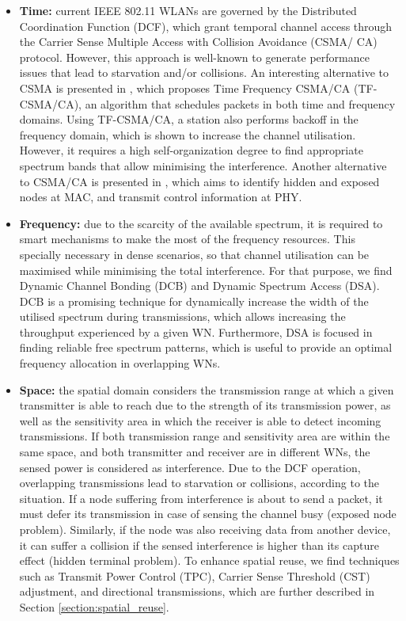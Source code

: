 \documentclass[12pt, a4paper,twoside]{tesi_upf}
\begin{document}
			\begin{itemize}
				\item \textbf{Time:} current IEEE 802.11 WLANs are governed by the Distributed Coordination Function (DCF), which grant temporal channel access through the Carrier Sense Multiple Access with Collision Avoidance (CSMA/ CA) protocol. However, this approach is well-known to generate performance issues that lead to starvation and/or collisions. An interesting alternative to CSMA is presented in \cite{herzen2015csma}, which proposes Time Frequency CSMA/CA (TF-CSMA/CA), an algorithm that schedules packets in both time and frequency domains. Using TF-CSMA/CA, a station also performs backoff in the frequency domain, which is shown to increase the channel utilisation. However, it requires a high self-organization degree to find appropriate spectrum bands that allow minimising the interference. Another alternative to CSMA/CA is presented in \cite{wang2012combating}, which aims to identify hidden and exposed nodes at MAC, and transmit control information at PHY.
				\item \textbf{Frequency:} due to the scarcity of the available spectrum, it is required to smart mechanisms to make the most of the frequency resources. This specially necessary in dense scenarios, so that channel utilisation can be maximised while minimising the total interference. For that purpose, we find Dynamic Channel Bonding (DCB) and Dynamic Spectrum Access (DSA). DCB is a promising technique for dynamically increase the width of the utilised spectrum during transmissions, which allows increasing the throughput experienced by a given WN. Furthermore, DSA is focused in finding reliable free spectrum patterns, which is useful to provide an optimal frequency allocation in overlapping WNs.
				\item \textbf{Space:} the spatial domain considers the transmission range at which a given transmitter is able to reach due to the strength of its transmission power, as well as the sensitivity area in which the receiver is able to detect incoming transmissions. If both transmission range and sensitivity area are within the same space, and both transmitter and receiver are in different WNs, the sensed power is considered as interference. Due to the DCF operation, overlapping transmissions lead to starvation or collisions, according to the situation. If a node suffering from interference is about to send a packet, it must defer its transmission in case of sensing the channel busy (exposed node problem). Similarly, if the node was also receiving data from another device, it can suffer a collision if the sensed interference is higher than its capture effect (hidden terminal problem). To enhance spatial reuse, we find techniques such as Transmit Power Control (TPC), Carrier Sense Threshold (CST) adjustment, and directional transmissions, which are further described in Section \ref{section:spatial_reuse}.
			\end{itemize}		
				
\end{document}
